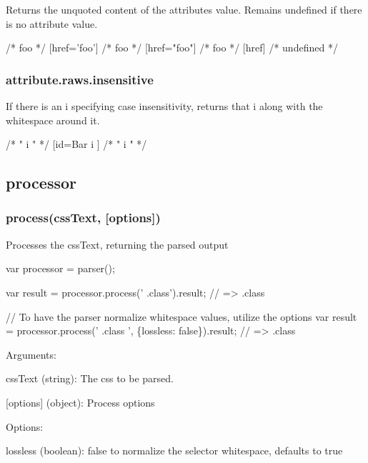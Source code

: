 Returns the unquoted content of the attribute\textquotesingle{}s value. Remains {\ttfamily undefined} if there is no attribute value.


\begin{DoxyCode}
[href=foo] /* foo */
[href='foo'] /* foo */
[href="foo"] /* foo */
[href] /* undefined */
\end{DoxyCode}


\subsubsection*{{\ttfamily attribute.\+raws.\+insensitive}}

If there is an {\ttfamily i} specifying case insensitivity, returns that {\ttfamily i} along with the whitespace around it.


\begin{DoxyCode}
[id=Bar i ] /* " i " */
[id=Bar   i  ] /* "   i  " */
\end{DoxyCode}


\subsection*{{\ttfamily processor}}

\subsubsection*{{\ttfamily process(css\+Text, \mbox{[}options\mbox{]})}}

Processes the {\ttfamily css\+Text}, returning the parsed output


\begin{DoxyCode}
var processor = parser();

var result = processor.process(' .class').result;
// =>  .class

// To have the parser normalize whitespace values, utilize the options
var result = processor.process('  .class  ', \{lossless: false\}).result;
// => .class
\end{DoxyCode}


Arguments\+:


\begin{DoxyItemize}
\item {\ttfamily css\+Text (string)}\+: The css to be parsed.
\item {\ttfamily \mbox{[}options\mbox{]} (object)}\+: Process options
\end{DoxyItemize}

Options\+:


\begin{DoxyItemize}
\item {\ttfamily lossless (boolean)}\+: false to normalize the selector whitespace, defaults to true 
\end{DoxyItemize}